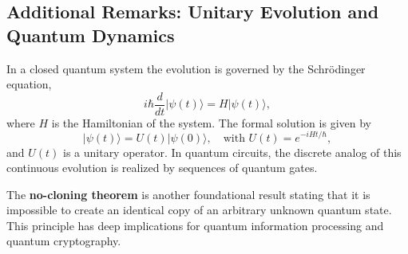 
\subsection{Additional Remarks: Unitary Evolution and Quantum Dynamics}
\label{subsec:unitary_evolution}

In a closed quantum system the evolution is governed by the Schrödinger equation,
\[
i\hbar \frac{d}{dt} |\psi(t)\rangle = H |\psi(t)\rangle,
\]
where \(H\) is the Hamiltonian of the system. The formal solution is given by
\[
|\psi(t)\rangle = U(t)|\psi(0)\rangle,\quad \text{with } U(t)=e^{-iHt/\hbar},
\]
and \(U(t)\) is a unitary operator. In quantum circuits, the discrete analog of this continuous evolution is realized by sequences of quantum gates.

The \textbf{no-cloning theorem} is another foundational result stating that it is impossible to create an identical copy of an arbitrary unknown quantum state. This principle has deep implications for quantum information processing and quantum cryptography.
